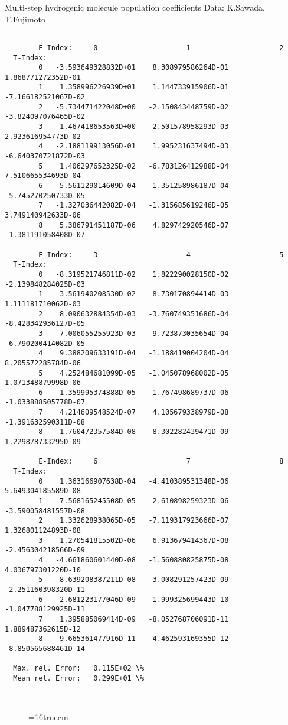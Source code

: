 \documentclass[12pt,dvipdfmx]{article}
\begin{document}
 Multi-step hydrogenic molecule population coefficients
 Data: K.Sawada, T.Fujimoto \cite{kn:Sawada}
\begin{small}\begin{verbatim}

        E-Index:     0                     1                     2
  T-Index:
        0   -3.593649328832D+01    8.308979586264D-01    1.868771272352D-01
        1    1.358996226939D+01    1.144733915906D-01   -7.166182521067D-02
        2   -5.734471422048D+00   -2.150843448759D-02   -3.824097076465D-02
        3    1.467418653563D+00   -2.501578958293D-03    2.923616954773D-02
        4   -2.188119913056D-01    1.995231637494D-03   -6.640370721872D-03
        5    1.406297652325D-02   -6.783126412988D-04    7.510665534693D-04
        6    5.561129014609D-04    1.351258986187D-04   -5.745270250733D-05
        7   -1.327036442082D-04   -1.315685619246D-05    3.749140942633D-06
        8    5.386791451187D-06    4.829742920546D-07   -1.381191058408D-07

        E-Index:     3                     4                     5
  T-Index:
        0   -8.319521746811D-02    1.822290028150D-02   -2.139848284025D-03
        1    3.561940208530D-02   -8.730170894414D-03    1.111181710062D-03
        2    8.090632884354D-03   -3.760749351686D-04   -8.428342936127D-05
        3   -7.006055255923D-03    9.723873035654D-04   -6.790200414082D-05
        4    9.388209633191D-04   -1.188419004204D-04    8.205572285784D-06
        5    4.252484681099D-05   -1.045078968002D-05    1.071348879998D-06
        6   -1.359995374888D-05    1.767498689737D-06   -1.033888505778D-07
        7    4.214609548524D-07    4.105679338979D-08   -1.391632590311D-08
        8    1.760472357584D-08   -8.302282439471D-09    1.229878733295D-09

        E-Index:     6                     7                     8
  T-Index:
        0    1.363166907638D-04   -4.410389531348D-06    5.649304185589D-08
        1   -7.568165245508D-05    2.610898259323D-06   -3.590058481557D-08
        2    1.332628938065D-05   -7.119317923666D-07    1.326801124893D-08
        3    1.270541815502D-06    6.913679414367D-08   -2.456304218566D-09
        4   -4.661860601440D-08   -1.560880825875D-08    4.036797301220D-10
        5   -8.639208387211D-08    3.008291257423D-09   -2.251160398320D-11
        6    2.681223177046D-09    1.999325699443D-10   -1.047788129925D-11
        7    1.395885069414D-09   -8.052768706091D-11    1.889487362615D-12
        8   -9.665361477916D-11    4.462593169355D-12   -8.850565688461D-14

  Max. rel. Error:   0.115E+02 \%
  Mean rel. Error:   0.299E+01 \%



\end{verbatim}\end{small}
\begin{figure} \label{2.2.5we}
\epsfxsize=16truecm
\end{figure}
\end{document}
